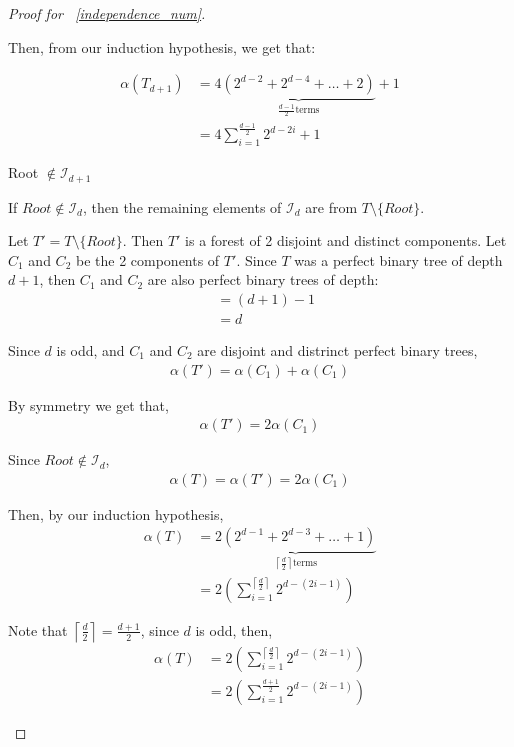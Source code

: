 \documentclass{amsart}
\theoremstyle{definition}
\begin{document}
\begin{proof}[Proof for ~\ref{independence_num}]
\begin{caseof}
\begin{subcaseof}
			Then, from our induction hypothesis, we get that:

			\begin{align}
				\alpha(T_{d+1}) & = 4\underbrace{(2^{d - 2} + 2^{d - 4} + \ldots + 2)}_{\frac{d-1}{2} \text{terms}} + 1                           \nonumber \\
						& = 4 \displaystyle\sum_{i = 1}^{\frac{d-1}{2}}2^{d - 2i} + 1 	
			\label{eq:odd_case}
			\end{align}


		\item Root $\not\in \mathcal{I}_{d + 1}$

			If $Root \not\in \mathcal{I}_d$, then the remaining elements of $\mathcal{I}_d$ are from $T \setminus \{Root\}$.

			Let $T' = T\setminus\{Root\}$. Then $T'$ is a forest of 2 disjoint and distinct components. Let $C_1$ and $C_2$ be the 2 components of $T'$. Since $T$ was a perfect binary tree of depth $d + 1$, then $C_1$ and $C_2$ are also perfect binary trees of depth:
			\begin{align*}
				 & = (d + 1) - 1 \\
				 & = d
			\end{align*}

			Since $d$ is odd, and $C_1$ and $C_2$ are disjoint and distrinct perfect binary trees,
			\begin{align*}
				\alpha(T') = \alpha(C_1) + \alpha(C_1)
			\end{align*}

			By symmetry we get that,
			\begin{align*}
				\alpha(T') = 2\alpha(C_1)
			\end{align*}

			Since $Root \not\in \mathcal{I}_d$,
			\begin{align*}
				\alpha(T) = \alpha(T') = 2\alpha(C_1)
			\end{align*}

			Then, by our induction hypothesis,
			\begin{align}
				\alpha(T) & = \underbrace{2(2^{d - 1} + 2^{d - 3} + \dots + 1)}_{\left\lceil\frac{d}{2}\right\rceil \text{terms}}          \nonumber \\
					  & = 2\left(\displaystyle\sum_{i = 1}^{\left\lceil\frac{d}{2}\right\rceil}2^{d - (2i - 1)}\right) \nonumber
			\end{align}

			Note that $\left\lceil\frac{d}{2}\right\rceil = \frac{d + 1}{2}$, since $d$ is odd, then,
			\begin{align}
				\alpha(T) & = 2\left(\displaystyle\sum_{i = 1}^{\left\lceil\frac{d}{2}\right\rceil}2^{d - (2i - 1)}\right) \nonumber \\
					  & = 2\left(\displaystyle\sum_{i = 1}^{\frac{d + 1}{2}}2^{d - (2i - 1)}\right)  \label{eq:even_case} 
			\end{align}



\end{subcaseof}
\end{caseof}
\end{proof}
\end{document}
